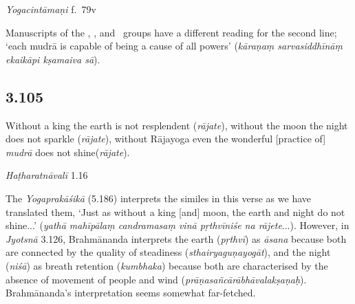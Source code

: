 \begin{ekdosis}
\begin{testimonia}[hp03_104]
\emph{Yogacintāmaṇi} f.~79v
\begin{versinnote}
\end{versinnote}

\end{testimonia}

\begin{philcomm}[hp03_104]
Manuscripts of the \textbeta, \texteta, and \textepsilon\ groups have a different reading for the second line; `each mudrā is capable of being a cause of all powers' (\emph{kāraṇaṃ sarvasiddhīnāṃ ekaikāpi kṣamaiva sā}).
\end{philcomm}


\subsection*{3.105}
\begin{translation}[hp03_105]
Without a king the earth is not resplendent (\emph{rājate}), without the moon the night does not sparkle (\emph{rājate}), without Rājayoga even the wonderful [practice of] \emph{mudrā} does not shine(\emph{rājate}).
\end{translation}



\begin{testimonia}[hp03_105]
\emph{Haṭharatnāvalī} 1.16
\begin{versinnote}
\end{versinnote}

\end{testimonia}

\begin{philcomm}[hp03_105]
The \emph{Yogaprakāśikā} (5.186) interprets the similes in this verse as we have translated them, `Just as without a king [and] moon, the earth and night do not shine...' (\emph{yathā mahīpālaṃ candramasaṃ vinā pṛthvīniśe na rājete}...). However, in \emph{Jyotsnā} 3.126, Brahmānanda interprets the earth (\emph{pṛthvī}) as \emph{āsana} because both are connected by the quality of steadiness (\emph{sthairyaguṇayogāt}), and the night (\emph{niśā}) as breath retention (\emph{kumbhaka}) because both are characterised by the absence of movement of people and wind (\emph{prāṇasañcārābhāvalakṣaṇaḥ}). Brahmānanda's interpretation seems somewhat far-fetched. 
\end{philcomm}


\end{ekdosis}
